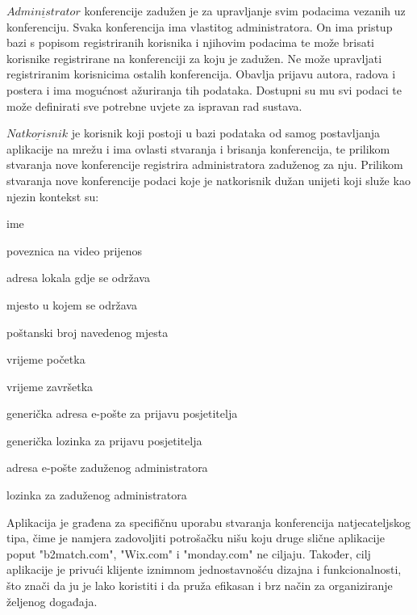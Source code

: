 		$\underline{Administrator}$ konferencije zadužen je za upravljanje svim podacima vezanih uz konferenciju. Svaka konferencija ima vlastitog administratora. On ima pristup bazi s popisom registriranih korisnika i njihovim podacima te može brisati korisnike registrirane na konferenciji za koju je zadužen. Ne može upravljati registriranim korisnicima ostalih konferencija. Obavlja prijavu autora, radova i postera i ima mogućnost ažuriranja tih podataka. Dostupni su mu svi podaci te može definirati sve potrebne uvjete za ispravan rad sustava.
		
		$\underline{Natkorisnik}$ je korisnik koji postoji u bazi podataka od samog postavljanja aplikacije na mrežu i ima ovlasti stvaranja i brisanja konferencija, te prilikom stvaranja nove konferencije registrira administratora zaduženog za nju. Prilikom stvaranja nove konferencije podaci koje je natkorisnik dužan unijeti koji služe kao njezin kontekst su:
		\begin{packed_item}
			\item ime
			\item poveznica na video prijenos
			\item adresa lokala gdje se održava
			\item mjesto u kojem se održava
			\item poštanski broj navedenog mjesta
			\item vrijeme početka
			\item vrijeme završetka
			\item generička adresa e-pošte za prijavu posjetitelja
			\item generička lozinka za prijavu posjetitelja
			\item adresa e-pošte zaduženog administratora
			\item lozinka za zaduženog administratora
		\end{packed_item}
		
		Aplikacija je građena za specifičnu uporabu stvaranja konferencija natjecateljskog tipa, čime je namjera zadovoljiti potrošačku nišu koju druge slične aplikacije poput "b2match.com", "Wix.com" i "monday.com" ne ciljaju. Također, cilj aplikacije je privući klijente iznimnom jednostavnošću dizajna i funkcionalnosti, što znači da ju je lako koristiti i da pruža efikasan i brz način za organiziranje željenog događaja.

		\newpage
		
